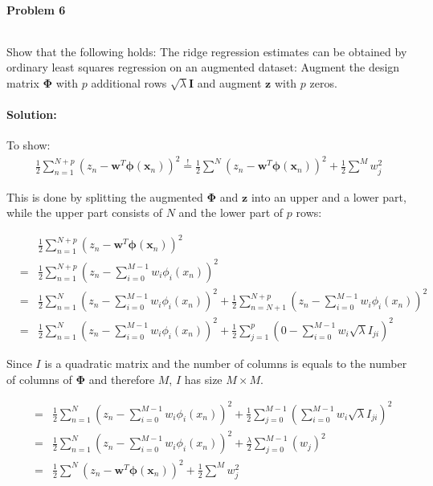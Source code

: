 \documentclass{article}
\renewcommand{\Vec}[1]{\ensuremath{\mathbf{#1}}}
\newcommand{\Mtx}[1]{\ensuremath{\mathbf{#1}}}
\begin{document}
\paragraph*{Problem 6}
$\;$ 

Show that the following holds:
The ridge regression estimates can be obtained by ordinary
least squares regression on an augmented dataset: Augment the
design matrix $\Mtx{\Phi}$ with $p$ additional rows  $\sqrt{\lambda}\Mtx{I}$
and augment $\Vec{z}$ with $p$ zeros.

\paragraph*{Solution:}

To show:
\begin{eqnarray}
\frac{1}{2}\sum_{n=1}^{N+p} \left(z_n- \Vec{w}^T\Vec{\phi}(\Vec{x}_n)\right)^2 \overset{!}{=} \frac{1}{2}\sum^{N} \left(z_n- \Vec{w}^T\Vec{\phi}(\Vec{x}_n)\right)^2 + \frac{1}{2}\sum^{M} w_j^2
\end{eqnarray}

This is done by splitting the augmented $\Mtx{\Phi}$ and $\Vec{z}$ into an upper and a lower part, while the upper part consists of $N$ and the lower part of $p$ rows:

\begin{eqnarray}
&&\frac{1}{2}\sum_{n=1}^{N+p} \left(z_n- \Vec{w}^T\Vec{\phi}(\Vec{x}_n)\right)^2\\
&=& \frac{1}{2}\sum_{n=1}^{N+p} \left(z_n- \sum_{i=0}^{M-1} w_i \phi_i(x_n)\right)^2\\
&=& \frac{1}{2}\sum_{n=1}^{N} \left(z_n- \sum_{i=0}^{M-1} w_i \phi_i(x_n)\right)^2 + \frac{1}{2}\sum_{n=N+1}^{N+p} \left(z_n- \sum_{i=0}^{M-1} w_i \phi_i(x_n)\right)^2\\
&=& \frac{1}{2}\sum_{n=1}^{N} \left(z_n- \sum_{i=0}^{M-1} w_i \phi_i(x_n)\right)^2 + \frac{1}{2}\sum_{j=1}^{p} \left(0- \sum_{i=0}^{M-1} w_i \sqrt{\lambda} I_{ji} \right)^2
\end{eqnarray}

Since $I$ is a quadratic matrix and the number of columns is equals to the number of columns of $\Mtx{\Phi}$ and therefore $M$, $I$ has size $M\times M$.

\begin{eqnarray}
&=& \frac{1}{2}\sum_{n=1}^{N} \left(z_n- \sum_{i=0}^{M-1} w_i \phi_i(x_n)\right)^2 + \frac{1}{2}\sum_{j=0}^{M-1} \left(\sum_{i=0}^{M-1} w_i \sqrt{\lambda} I_{ji} \right)^2\\
&=& \frac{1}{2}\sum_{n=1}^{N} \left(z_n- \sum_{i=0}^{M-1} w_i \phi_i(x_n)\right)^2 + \frac{\lambda}{2}\sum_{j=0}^{M-1} \left(w_j \right)^2\\
&=& \frac{1}{2}\sum^{N} \left(z_n- \Vec{w}^T\Vec{\phi}(\Vec{x}_n)\right)^2 + \frac{1}{2}\sum^{M} w_j^2
\end{eqnarray}
\end{document}
